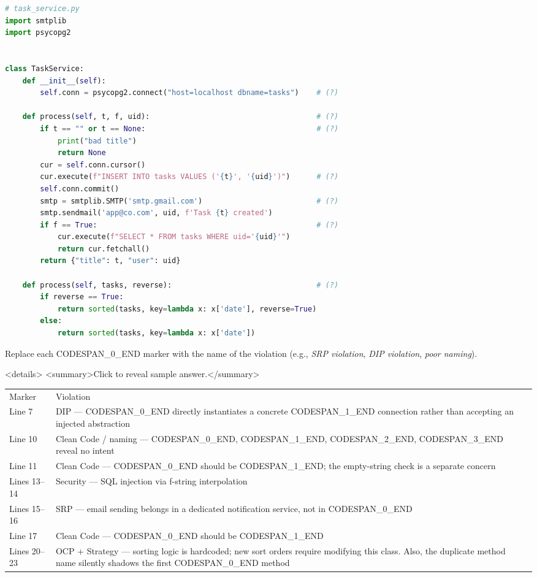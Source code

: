 \documentclass[11pt,a4paper]{book}
\begin{document}
\begin{lstlisting}[language=Python]
# task_service.py
import smtplib
import psycopg2


class TaskService:
    def __init__(self):
        self.conn = psycopg2.connect("host=localhost dbname=tasks")    # (?)

    def process(self, t, f, uid):                                      # (?)
        if t == "" or t == None:                                       # (?)
            print("bad title")
            return None
        cur = self.conn.cursor()
        cur.execute(f"INSERT INTO tasks VALUES ('{t}', '{uid}')")      # (?)
        self.conn.commit()
        smtp = smtplib.SMTP('smtp.gmail.com')                          # (?)
        smtp.sendmail('app@co.com', uid, f'Task {t} created')
        if f == True:                                                  # (?)
            cur.execute(f"SELECT * FROM tasks WHERE uid='{uid}'")
            return cur.fetchall()
        return {"title": t, "user": uid}

    def process(self, tasks, reverse):                                 # (?)
        if reverse == True:
            return sorted(tasks, key=lambda x: x['date'], reverse=True)
        else:
            return sorted(tasks, key=lambda x: x['date'])
\end{lstlisting}

Replace each CODESPAN\_0\_END marker with the name of the violation (e.g., \textit{SRP violation}, \textit{DIP violation}, \textit{poor naming}).

<details>
<summary>Click to reveal sample answer.</summary>

\begin{tabular}{ll}
\hline
Marker & Violation \\
Line 7 & DIP --- CODESPAN\_0\_END directly instantiates a concrete CODESPAN\_1\_END connection rather than accepting an injected abstraction \\
Line 10 & Clean Code / naming --- CODESPAN\_0\_END, CODESPAN\_1\_END, CODESPAN\_2\_END, CODESPAN\_3\_END reveal no intent \\
Line 11 & Clean Code --- CODESPAN\_0\_END should be CODESPAN\_1\_END; the empty-string check is a separate concern \\
Lines 13--14 & Security --- SQL injection via f-string interpolation \\
Lines 15--16 & SRP --- email sending belongs in a dedicated notification service, not in CODESPAN\_0\_END \\
Line 17 & Clean Code --- CODESPAN\_0\_END should be CODESPAN\_1\_END \\
Lines 20--23 & OCP + Strategy --- sorting logic is hardcoded; new sort orders require modifying this class. Also, the duplicate method name silently shadows the first CODESPAN\_0\_END method \\
\hline
\end{tabular}
\end{document}
